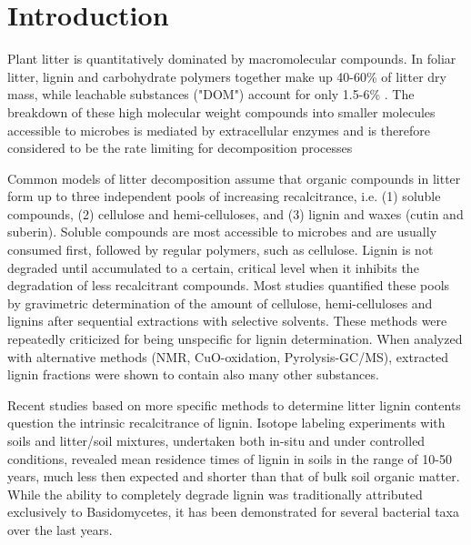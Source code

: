 \section*{Introduction}

Plant litter is quantitatively dominated by macromolecular compounds. In foliar litter, lignin and carbohydrate polymers together make up 40-60\% of litter dry mass\cite{Berg2008}, while leachable substances ("DOM") account for only 1.5-6\% \cite{Don2005}. The breakdown of these high molecular weight compounds into smaller molecules accessible to microbes is mediated by extracellular enzymes and is therefore considered to be the rate limiting for decomposition processes \cite{Sinsabaugh2010}

Common models of litter decomposition \cite{Berg1980, Couteaux1995, Moorhead2006, Adair2008} assume that organic compounds in litter form up to three independent pools of increasing recalcitrance, i.e. (1) soluble compounds, (2) cellulose and hemi-celluloses, and (3) lignin and waxes (cutin and suberin). Soluble compounds are most accessible to microbes and are usually consumed first, followed by regular polymers, such as cellulose. Lignin is not degraded until accumulated to a certain, critical level when it inhibits the degradation of less recalcitrant compounds. Most studies quantified these pools by gravimetric determination of the amount of cellulose, hemi-celluloses and lignins after sequential extractions with selective solvents. These methods were repeatedly criticized for being unspecific for lignin determination\cite{Hatfield2005}. When analyzed with alternative methods (NMR, CuO-oxidation, Pyrolysis-GC/MS), extracted lignin fractions were shown to contain also many other substances\cite{Preston1997}.

Recent studies based on more specific methods to determine litter lignin contents question the intrinsic recalcitrance of lignin. Isotope labeling experiments with soils and litter/soil mixtures, undertaken both in-situ and under controlled conditions,  revealed mean residence times of lignin in soils in the range of 10-50 years, much less then expected and shorter than that of bulk soil organic matter\cite{Amelung2008, Thevenot2010a, Bol2009}. While the ability to completely degrade lignin was traditionally  attributed exclusively to Basidomycetes, it has been demonstrated for several bacterial taxa over the last years\cite{Bugg2011}.


